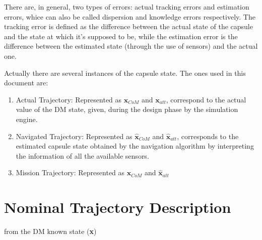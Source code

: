 There are, in general, two types of errors: actual tracking errors and estimation
errors, whice can also be called dispersion and knowledge errors respectively.
The tracking error is defined as the difference between the actual state of the capsule and the state
at which it's supposed to be, while the estimation error is the difference between the estimated state
(through the use of sensors) and the actual one.

Actually there are several instances of the capsule state. The ones used in this document are:

\begin{enumerate}
    \item Actual Trajectory: Represented as $\textbf{x}_{CoM}$ and $\textbf{x}_{att}$, correspond
    to the actual value of the DM state, given, during the design phase by the simulation engine.
    \item Navigated Trajectory: Represented as $\hat{\textbf{x}}_{CoM}$ and $\hat{\textbf{x}}_{att}$,
    corresponds to the estimated capsule state obtained by the navigation algorithm by interpreting the
    information of all the available sensors.
    \item Mission Trajectory: Represented as $\hat{\textbf{x}}_{CoM}$ and $\hat{\textbf{x}}_{att}$
\end{enumerate}

\newpage

\section{Nominal Trajectory Description}

from the DM known state (\textbf{x})